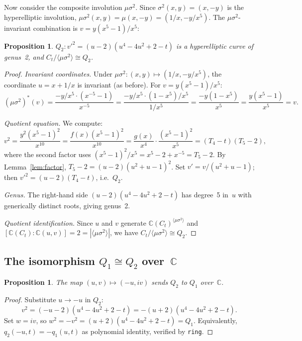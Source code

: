 \documentclass[11pt]{article}
\theoremstyle{plain}
\newtheorem{proposition}[theorem]{Proposition}
\theoremstyle{definition}
\theoremstyle{remark}
\newcommand{\C}{\mathbb{C}}
\begin{document}
Now consider the composite involution $\mu\sigma^2$.
Since $\sigma^2(x,y) = (x,-y)$ is the hyperelliptic involution,
$\mu\sigma^2(x,y) = \mu(x,-y) = (1/x, -y/x^5)$.
The $\mu\sigma^2$-invariant combination is
$v = y(x^5-1)/x^5$:

\begin{proposition}\label{prop:Q2}
$Q_2\colon v'^2 = (u-2)(u^4 - 4u^2 + 2 - t)$ is a hyperelliptic
curve of genus~2, and $C_t/\langle\mu\sigma^2\rangle \cong Q_2$.
\end{proposition}

\begin{proof}
\emph{Invariant coordinates.}
Under $\mu\sigma^2\colon (x,y) \mapsto (1/x, -y/x^5)$, the coordinate
$u = x + 1/x$ is invariant (as before).  For $v = y(x^5-1)/x^5$:
\[
  (\mu\sigma^2)^*(v) = \frac{-y/x^5 \cdot (x^{-5}-1)}{x^{-5}}
  = \frac{-y/x^5 \cdot (1-x^5)/x^5}{1/x^5}
  = \frac{-y(1-x^5)}{x^5}
  = \frac{y(x^5-1)}{x^5} = v.
\]

\emph{Quotient equation.}
We compute:
\[
  v^2 = \frac{y^2(x^5-1)^2}{x^{10}}
  = \frac{f(x)(x^5-1)^2}{x^{10}}
  = \frac{g(x)}{x^4} \cdot \frac{(x^5-1)^2}{x^5}
  = (T_4 - t)(T_5 - 2),
\]
where the second factor uses
$(x^5-1)^2/x^5 = x^5 - 2 + x^{-5} = T_5 - 2$.
By Lemma~\ref{lem:factor}, $T_5 - 2 = (u-2)(u^2+u-1)^2$.
Set $v' = v/(u^2+u-1)$; then $v'^2 = (u-2)(T_4-t)$, i.e.\ $Q_2$.

\emph{Genus.}
The right-hand side $(u-2)(u^4-4u^2+2-t)$ has degree~5 in~$u$
with generically distinct roots, giving genus~2.

\emph{Quotient identification.}
Since $u$ and $v$ generate $\C(C_t)^{\langle\mu\sigma^2\rangle}$ and
$[\C(C_t):\C(u,v)] = 2 = |\langle\mu\sigma^2\rangle|$,
we have $C_t/\langle\mu\sigma^2\rangle \cong Q_2$.
\end{proof}

\subsection{The isomorphism $Q_1 \cong Q_2$ over~$\C$}

\begin{proposition}\label{prop:iso}
The map $(u,v) \mapsto (-u, iv)$ sends $Q_2$ to $Q_1$ over~$\C$.
\end{proposition}

\begin{proof}
Substitute $u \to -u$ in $Q_2$:
\[
  v^2 = (-u-2)(u^4 - 4u^2 + 2 - t) = -(u+2)(u^4 - 4u^2 + 2 - t).
\]
Set $w = iv$, so $w^2 = -v^2 = (u+2)(u^4 - 4u^2 + 2 - t) = Q_1$.
Equivalently, $q_2(-u,t) = -q_1(u,t)$ as polynomial identity,
verified by \texttt{ring}.
\end{proof}
\end{document}
